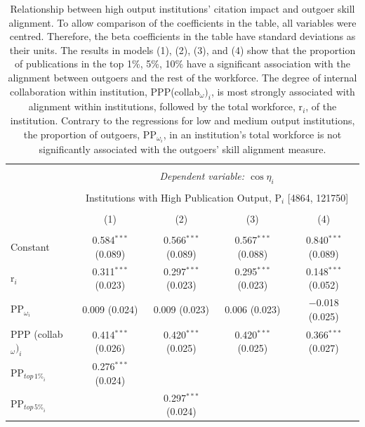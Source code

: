 \documentclass[draft,final]{vutinfth} %
\begin{document}
\begin{table} \centering 
  \caption{Relationship between high output institutions' citation impact and outgoer skill alignment. To allow comparison of the coefficients in the table, all variables were centred. Therefore, the beta coefficients in the table have standard deviations as their units. The results in models (1), (2), (3), and (4) show that the proportion of publications in the top 1\%, 5\%, 10\% have a significant association with the alignment between outgoers and the rest of the workforce. The degree of internal collaboration within institution, PPP(collab$_{\omega})_{i}$, is most strongly associated with alignment within institutions, followed by the total workforce, r$_{i}$, of the institution. Contrary to the regressions for low and medium output institutions, the proportion of outgoers, PP$_{\omega_i}$, in an institution's total workforce is not significantly associated with the outgoers' skill alignment measure.} 
  \label{Table S7} 
\small 
\scriptsize
\begin{tabularx}{\textwidth}{@{\extracolsep{\fill}}lcccc}
\\[-1.8ex]\hline 
\hline \\[-1.8ex] 
& \multicolumn{4}{c}{\textit{Dependent variable: $\cos{\eta}_{i}$}} \\  
\cline{2-5} 
\\[-1.8ex] & \multicolumn{4}{c}{Institutions with High Publication Output, P$_{i}$ [4864, 121750]} \\ 
\\[-1.8ex] & (1) & (2) & (3) & (4)\\ 
\hline \\[-1.8ex] 
 Constant & 0.584$^{***}$ (0.089) & 0.566$^{***}$ (0.089) & 0.567$^{***}$ (0.088) & 0.840$^{***}$ (0.089) \\ 
  r$_{i}$ & 0.311$^{***}$ (0.023) & 0.297$^{***}$ (0.023) & 0.295$^{***}$ (0.023) & 0.148$^{***}$ (0.052) \\ 
  PP$_{\omega_i}$ & 0.009 (0.024) & 0.009 (0.023) & 0.006 (0.023) & $-$0.018 (0.025) \\ 
  PPP (collab$_\omega)_{i}$ & 0.414$^{***}$ (0.026) & 0.420$^{***}$ (0.025) & 0.420$^{***}$ (0.025) & 0.366$^{***}$ (0.027) \\ 
  PP$_{{top\,1\%}_{i}}$ & 0.276$^{***}$ (0.024) &  &  &  \\ 
  PP$_{{top\,5\%}_{i}}$ &  & 0.297$^{***}$ (0.024) &  &  \\ 

\end{tabularx}
\end{table}
\end{document}
